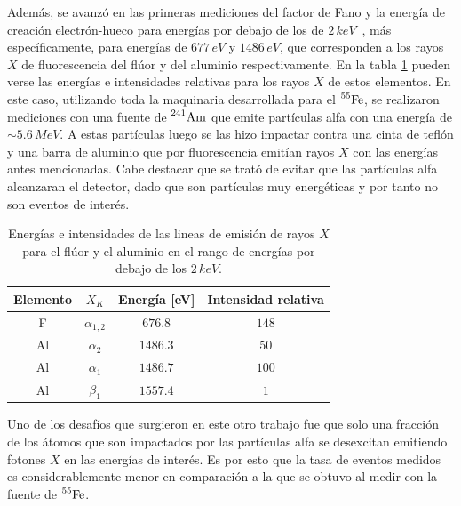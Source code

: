 Además, se avanzó en las primeras mediciones del factor de Fano y la energía de creación electrón-hueco para energías por debajo de los de $2\,\si{keV}$~\cite{TesisKevin}, más específicamente, para energías de $677\,\si{eV}$ y $1486\,\si{eV}$, que corresponden a los rayos $X$ de fluorescencia del flúor y del aluminio respectivamente. En la tabla \ref{tab:EnergiasFluorescenciaFAl} pueden verse las energías e intensidades relativas para los rayos $X$ de estos elementos. En este caso, utilizando toda la maquinaria desarrollada para el $\prescript{55}{}{\mbox{Fe}}$, se realizaron mediciones con una fuente de $\prescript{241}{}{\mbox{Am}}$ que emite partículas alfa con una energía de $\sim 5.6\,\si{MeV}$. A estas partículas luego se las hizo impactar contra una cinta de teflón y una barra de aluminio que por fluorescencia emitían rayos $X$ con las energías antes mencionadas. Cabe destacar que se trató de evitar que las partículas alfa alcanzaran el detector, dado que son partículas muy energéticas y por tanto no son eventos de interés.
\begin{table}[h]
\centering
\begin{tabular}{@{}cccc@{}}
\toprule
Elemento    &   $X_{K}$         &   Energía [eV]    &   Intensidad relativa \\ \hline \hline
F           &   $\alpha_{1,2}$  &   $676.8$         &   $148$               \\
Al          &   $\alpha_{2}$    &   $1486.3$        &   $50$                \\
Al          &   $\alpha_{1}$    &   $1486.7$        &   $100$               \\
Al          &   $\beta_{1}$     &   $1557.4$        &   $1$                 \\ \bottomrule
\end{tabular}
\caption{\footnotesize{Energías e intensidades de las lineas de emisión de rayos $X$ para el flúor y el aluminio en el rango de energías por debajo de los $2\,\si{keV}$.}}
\label{tab:EnergiasFluorescenciaFAl}
\end{table}

Uno de los desafíos que surgieron en este otro trabajo fue que solo una fracción de los átomos que son impactados por las partículas alfa se desexcitan emitiendo fotones $X$ en las energías de interés. Es por esto que la tasa de eventos medidos es considerablemente menor en comparación a la que se obtuvo al medir con la fuente de $\prescript{55}{}{\mbox{Fe}}$.

